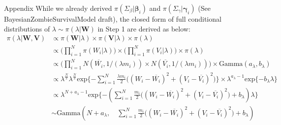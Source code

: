 \documentclass[a4paper, 12pt]{article}
\makeatletter
\renewcommand{\section}{\@startsection
	{section}    {1}    {0mm}    {-0.7\baselineskip}    {0.08\baselineskip}    {\normalfont\large\sc\center\bf}}
\makeatother
\begin{document}
\section{Appendix}
\noindent While we already derived $\pi(\Sigma_{\beta}|\mathbf{\beta}_i)$ and $\pi(\Sigma_{\gamma}|\mathbf{\gamma}_i)$ (See BayesianZombieSurvivalModel draft), the closed form of full conditional distributions of $\lambda \sim \pi(\lambda|\mathbf{W})$ in Step 1 are derived as below:
	\begin{equation*}
	\begin{aligned}
\pi(\lambda|\mathbf{W}, \mathbf{V})	&\propto\pi(\mathbf{W}|\lambda)\times \pi(\mathbf{V}|\lambda)\times \pi(\lambda) \\
	&\propto \Big(\prod_{i=1}^N \pi(W_i|\lambda)\Big) \times\Big(\prod_{i=1}^N \pi(V_i|\lambda)\Big) \times \pi(\lambda)\\
	& \propto \Big(\prod_{i=1}^N N(\overline{W_i}, 1/(\lambda m_i)) \times N(\overline{V_i}, 1/(\lambda m_i)) \Big) \times \mbox{Gamma}(a_{\lambda}, b_{\lambda})\\
	& \propto \lambda^{\frac{N}{2}} \lambda^{\frac{N}{2}} \mbox{exp}\{-\sum_{i=1}^N \frac{\lambda m_i}{2}\Big((W_i - \overline{W_i})^2 + (V_i - \overline{V_i})^2\Big)\} \times \lambda^{a_{\lambda}-1}\mbox{exp}\{-b_{\lambda}\lambda\}\\
	& \propto \lambda^{{N} + a_{\lambda}-1}\mbox{exp}\{-(\sum_{i=1}^N \frac{ m_i}{2}\Big((W_i - \overline{W_i})^2 + (V_i - \overline{V_i})^2\Big)+b_{\lambda})\lambda\} \\
	&\sim \mbox{Gamma}(N + a_{\lambda},\quad \sum_{i=1}^N \frac{ m_i}{2}\Big((W_i - \overline{W_i})^2+ (V_i - \overline{V_i})^2 \Big)+b_{\lambda})	
	\end{aligned}
	\end{equation*} 
 
\end{document}
